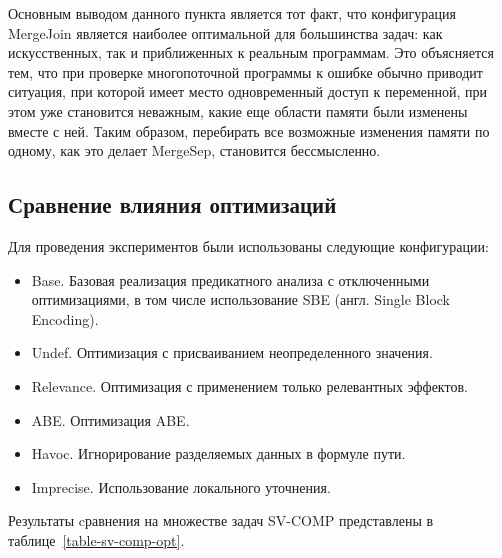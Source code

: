 Основным выводом данного пункта является тот факт, что конфигурация MergeJoin является наиболее оптимальной для большинства задач: как искусственных, так и приближенных к реальным программам. 
Это объясняется тем, что при проверке многопоточной программы к ошибке обычно приводит ситуация, при которой имеет место одновременный доступ к переменной, при этом уже становится неважным, какие еще области памяти были изменены вместе с ней.
Таким образом, перебирать все возможные изменения памяти по одному, как это делает MergeSep, становится бессмысленно.

\subsection{Сравнение влияния оптимизаций}

Для проведения экспериментов были использованы следующие конфигурации:

\begin{itemize}
\item Base. Базовая реализация предикатного анализа с отключенными оптимизациями, в том числе использование SBE (англ. Single Block Encoding).
\item Undef. Оптимизация с присваиванием неопределенного значения.
\item Relevance. Оптимизация с применением только релевантных эффектов.
\item ABE. Оптимизация ABE.
\item Havoc. Игнорирование разделяемых данных в формуле пути.
\item Imprecise. Использование локального уточнения.
\end{itemize}

Результаты cравнения на множестве задач SV-COMP представлены в таблице~\ref{table-sv-comp-opt}.

